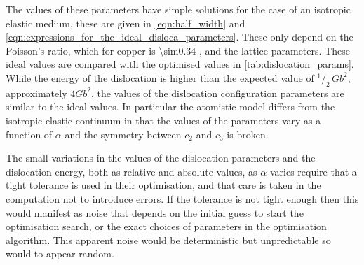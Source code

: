 The values of these parameters have simple solutions for the case of an isotropic elastic medium, these are given in \autoref{eqn:half_width} and \autoref{eqn:expressions_for_the_ideal_disloca_parameters}. These only depend on the Poisson's ratio, which for copper is \num{\sim0.34} \cite{Koster1961}, and the lattice parameters. These ideal values are compared with the optimised values in \autoref{tab:dislocation_params}. While the energy of the dislocation is higher than the expected value of $^1\!/_2\, G b^2$, approximately $4Gb^2$, the values of the dislocation configuration parameters are similar to the ideal values. In particular the atomistic model differs from the isotropic elastic continuum in that the values of the parameters vary as a function of $\alpha$ and the symmetry between $c_2$ and $c_3$ is broken.

The small variations in the values of the dislocation parameters and the dislocation energy, both as relative and absolute values,  as $\alpha$ varies require that a tight tolerance is used in their optimisation, and that care is taken in the computation not to introduce errors. If the tolerance is not tight enough then this would manifest as noise that depends on the initial guess to start the optimisation search, or the exact choices of parameters in the optimisation algorithm. This apparent noise would be deterministic but unpredictable so would to appear random.





